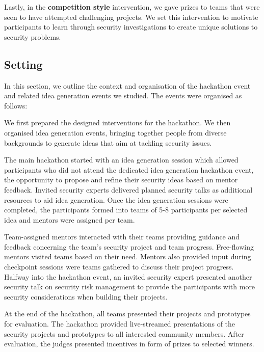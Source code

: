 \documentclass[runningheads]{llncs}
\begin{document}
Lastly, in the \textbf{competition style} intervention, we gave prizes to teams that were seen to have attempted challenging projects. We set this intervention to motivate participants to learn through security investigations to create unique solutions to security problems.

\subsection{Setting}\label{Sec:setting}
In this section, we outline the context and organisation of the hackathon event and related idea generation events we studied.
The events were organised as follows:

We first prepared the designed interventions for the hackathon. We then organised idea generation events, bringing together people from diverse backgrounds to generate ideas that aim at tackling security issues. %

The main hackathon started with an idea generation session which allowed participants who did not attend the dedicated idea generation hackathon event, the opportunity to propose and refine their security ideas based on mentor feedback. Invited security experts delivered planned security talks as additional resources to aid idea generation. 
Once the idea generation sessions were completed, the participants formed into teams of 5-8 participants per selected idea and mentors were assigned per team.

Team-assigned mentors interacted with their teams providing guidance and feedback concerning the team's security project and team progress. Free-flowing mentors visited teams based on their need. Mentors also provided input during checkpoint sessions were teams gathered to discuss their project progress.
Halfway into the hackathon event, an invited security expert presented another security talk on security risk management to provide the participants with more security considerations when building their projects.

At the end of the hackathon, all teams presented their projects and prototypes for evaluation. The hackathon provided live-streamed presentations of the security projects and prototypes to all interested community members. After evaluation, the judges presented incentives in form of prizes to selected winners. %
\end{document}
